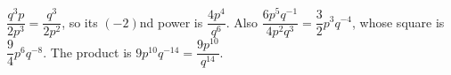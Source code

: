$\dfrac{q^3p}{2p^3}=\dfrac{q^3}{2p^2}$, so its $(-2)$nd power is $\dfrac{4p^4}{q^6}$. Also $\dfrac{6p^5q^{-1}}{4p^2q^3}=\dfrac{3}{2}p^3q^{-4}$, whose square is $\dfrac{9}{4}p^6q^{-8}$. The product is $9p^{10}q^{-14}=\boxed{\dfrac{9p^{10}}{q^{14}}}$.
